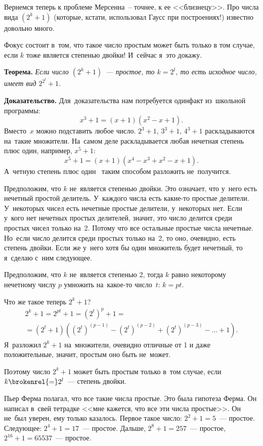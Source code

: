 Вернемся теперь к проблеме Мерсенна~-- точнее, к ее <<близнецу>>. Про числа вида
$(2^{k}+1)$ (которые, кстати, использовал Гаусс при построениях!) известно довольно много.

\pagebreak

Фокус состоит в~том, что такое число простым может быть только в том случае, если $k$ тоже является степенью двойки!
И~сейчас я~это докажу.

\textbf{Теорема.} \textit{Если число $(2^{k}+1)$~--- простое, то $k=2^{l}$, то есть исходное число, имеет вид $2^{2^{l}}+1$.}


\textbf{Доказательство.} Для~доказательства нам потребуется один\linebreak факт из~школьной программы:
$$x^{3}+1=(x+1)(x^{2}-x+1).$$ Вместо~$x$ можно подставить любое число.
$2^{3}+1$, $3^{3}+1$, $4^{3}+1$ раскладываются на~такие множители. На~самом деле
раскладывается любая нечетная степень плюс один, например, $x^{5}+1$:
$$
x^{5}+1=(x+1)(x^{4}-x^{3}+x^{2}-x+1).
$$
А~четную степень плюс один~ таким способом разложить не~получится.


Предположим, что $k$ не~является степенью двойки. Это означает, что у~него есть нечетный простой
делитель. У~каждого числа есть какие-то простые делители. У~некоторых чисел есть нечетные простые
делители, у~некоторых нет. Если у~кого нет нечетных простых делителей, значит, это число делится
среди простых чисел только на~2. Потому что все остальные простые числа нечетные. Но~если число
делится среди простых только на~2, то оно, очевидно, есть степень двойки. Если же у~него хотя бы один множитель будет
нечетный, то я~сделаю с~ним следующее.

Предположим, что $k$ не~является степенью 2, тогда $k$ равно некоторому нечетному числу $p$ умножить
на~какое-то число~$t$: $k=pt$.

Что же такое теперь $2^{k}+1$?
\begin{multline*}
2^{k}+1=
2^{pt}+1=
(2^{t})^{p}+1=
\\=
(2^{t}+1)((2^{t})^{(p-1)}-(2^{t})^{(p-2)}+(2^{t})^{(p-3)}-\ldots+1).
\end{multline*}
Я~разложил $2^{k}+1$ на~множители, очевидно отличные от 1 и даже положительные, значит, простым оно быть не~может.

Поэтому число $2^{k}+1$ может быть простым только в~том случае, если $k\brokenrel{=}2^{l}$~--- степень двойки.


Пьер Ферма полагал, что все такие числа простые. Это была гипотеза Ферма. Он написал в~свей
тетрадке <<мне кажется, что все эти числа простые>>. Он не~был уверен, ему только казалось. Первое
такое число: $2^{2}+1 = 5$~--- простое.
Следующее: $2^{4}+1=17$~--- простое.
Дальше, $2^{8}+1 = 257$~--- простое,
$2^{16}+1=65537$~--- простое.

